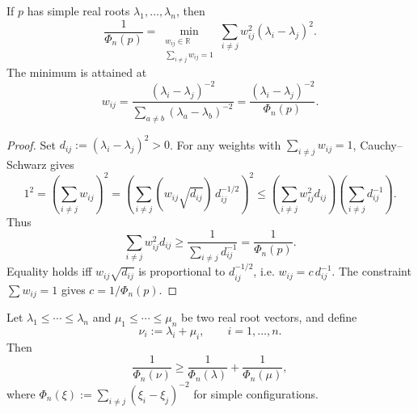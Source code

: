 \begin{lemma}\label{lem:q4-variational}
If $p$ has simple real roots $\lambda_1,\dots,\lambda_n$, then
\[
\frac1{\Phi_n(p)}
=
\min_{\substack{w_{ij}\in\mathbb R\\ \sum_{i\neq j} w_{ij}=1}}
\sum_{i\neq j} w_{ij}^2(\lambda_i-\lambda_j)^2.
\]
The minimum is attained at
\[
w_{ij}=\frac{(\lambda_i-\lambda_j)^{-2}}{\sum_{a\neq b}(\lambda_a-\lambda_b)^{-2}}
=\frac{(\lambda_i-\lambda_j)^{-2}}{\Phi_n(p)}.
\]
\end{lemma}

\begin{proof}
Set $d_{ij}:=(\lambda_i-\lambda_j)^2>0$.
For any weights with $\sum_{i\neq j} w_{ij}=1$, Cauchy--Schwarz gives
\[
1^2
=\left(\sum_{i\neq j} w_{ij}\right)^2
=\left(\sum_{i\neq j} (w_{ij}\sqrt{d_{ij}})\,d_{ij}^{-1/2}\right)^2
\le
\left(\sum_{i\neq j} w_{ij}^2 d_{ij}\right)
\left(\sum_{i\neq j} d_{ij}^{-1}\right).
\]
Thus
\[
\sum_{i\neq j} w_{ij}^2 d_{ij}\ge \frac1{\sum_{i\neq j} d_{ij}^{-1}}
=\frac1{\Phi_n(p)}.
\]
Equality holds iff $w_{ij}\sqrt{d_{ij}}$ is proportional to $d_{ij}^{-1/2}$, i.e. $w_{ij}=c\,d_{ij}^{-1}$.
The constraint $\sum w_{ij}=1$ gives $c=1/\Phi_n(p)$.
\end{proof}

\begin{proposition}\label{prop:q4-monotone-sum}
Let $\lambda_1\le\cdots\le\lambda_n$ and $\mu_1\le\cdots\le\mu_n$ be two real root vectors, and define
\[
\nu_i:=\lambda_i+\mu_i,\qquad i=1,\dots,n.
\]
Then
\[
\frac1{\Phi_n(\nu)}\ge \frac1{\Phi_n(\lambda)}+\frac1{\Phi_n(\mu)},
\]
where $\Phi_n(\xi):=\sum_{i\neq j}(\xi_i-\xi_j)^{-2}$ for simple configurations.
\end{proposition}

